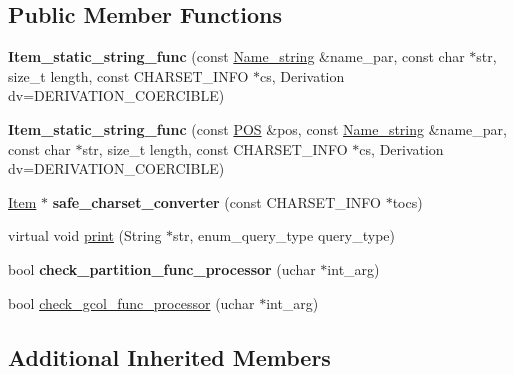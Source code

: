 \subsection*{Public Member Functions}
\begin{DoxyCompactItemize}
\item 
\mbox{\label{classItem__static__string__func_a2961126c226ac7fea1d6db26619da2eb}} 
{\bfseries Item\+\_\+static\+\_\+string\+\_\+func} (const \mbox{\hyperlink{className__string}{Name\+\_\+string}} \&name\+\_\+par, const char $\ast$str, size\+\_\+t length, const C\+H\+A\+R\+S\+E\+T\+\_\+\+I\+N\+FO $\ast$cs, Derivation dv=D\+E\+R\+I\+V\+A\+T\+I\+O\+N\+\_\+\+C\+O\+E\+R\+C\+I\+B\+LE)
\item 
\mbox{\label{classItem__static__string__func_ab34e90240f411242e16acc95e17b1b5d}} 
{\bfseries Item\+\_\+static\+\_\+string\+\_\+func} (const \mbox{\hyperlink{structYYLTYPE}{P\+OS}} \&pos, const \mbox{\hyperlink{className__string}{Name\+\_\+string}} \&name\+\_\+par, const char $\ast$str, size\+\_\+t length, const C\+H\+A\+R\+S\+E\+T\+\_\+\+I\+N\+FO $\ast$cs, Derivation dv=D\+E\+R\+I\+V\+A\+T\+I\+O\+N\+\_\+\+C\+O\+E\+R\+C\+I\+B\+LE)
\item 
\mbox{\label{classItem__static__string__func_a7632acecf198a886055a98ddc7baef99}} 
\mbox{\hyperlink{classItem}{Item}} $\ast$ {\bfseries safe\+\_\+charset\+\_\+converter} (const C\+H\+A\+R\+S\+E\+T\+\_\+\+I\+N\+FO $\ast$tocs)
\item 
virtual void \mbox{\hyperlink{classItem__static__string__func_a592a40880113216f223f6c484622ac0d}{print}} (String $\ast$str, enum\+\_\+query\+\_\+type query\+\_\+type)
\item 
\mbox{\label{classItem__static__string__func_a9ea8671bc13fa7ef27ece49537fb7298}} 
bool {\bfseries check\+\_\+partition\+\_\+func\+\_\+processor} (uchar $\ast$int\+\_\+arg)
\item 
bool \mbox{\hyperlink{classItem__static__string__func_affbcad090aae0059272342f77d51ae90}{check\+\_\+gcol\+\_\+func\+\_\+processor}} (uchar $\ast$int\+\_\+arg)
\end{DoxyCompactItemize}
\subsection*{Additional Inherited Members}


